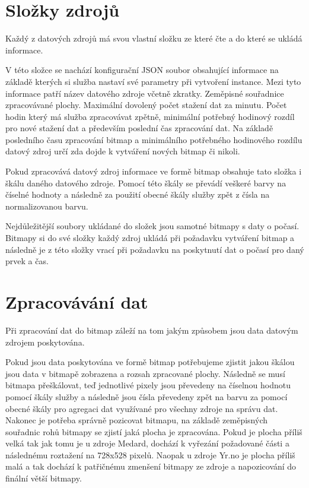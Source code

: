 \documentclass[czech,bachelor,dept460,male,csharp,cpdeclaration]{diploma}
\begin{document}
	\section{Složky zdrojů}
	
	Každý z datových zdrojů má svou vlastní složku ze které čte a do které se ukládá informace.
	
	V této složce se nachází konfigurační JSON soubor obsahující informace na základě kterých si služba nastaví své parametry při vytvoření instance. Mezi tyto informace patří název datového zdroje včetně zkratky. Zeměpisné souřadnice zpracovávané plochy. Maximální dovolený počet stažení dat za minutu. Počet hodin který má služba zpracovávat zpětně, minimální potřebný hodinový rozdíl pro nové stažení dat a především poslední čas zpracování dat. Na základě posledního času zpracování bitmap a minimálního potřebného hodinového rozdílu datový zdroj určí zda dojde k vytváření nových bitmap či nikoli.
	
	Pokud zpracovává datový zdroj informace ve formě bitmap obsahuje tato složka i škálu daného datového zdroje. Pomocí této škály se převádí veškeré barvy na číselné hodnoty a následně za použití obecné škály služby zpět z čísla na normalizovanou barvu.
	
	Nejdůležitější soubory ukládané do složek jsou samotné bitmapy s daty o počasí. Bitmapy si do své složky každý zdroj ukládá při požadavku vytváření bitmap a následně je z této složky vrací při požadavku na poskytnutí dat o počasí pro daný prvek a čas.
	
	\section{Zpracovávání dat}
	
	Při zpracování dat do bitmap záleží na tom jakým způsobem jsou data datovým zdrojem poskytována.
	
	Pokud jsou data poskytována ve formě bitmap potřebujeme zjistit jakou škálou jsou data v bitmapě zobrazena a rozsah zpracované plochy. Následně se musí bitmapa přeškálovat, teď jednotlivé pixely jsou převedeny na číselnou hodnotu pomocí škály služby a následně jsou čísla převedeny zpět na barvu za pomocí obecné škály pro agregaci dat využívané pro všechny zdroje na správu dat. Nakonec je potřeba správně pozicovat bitmapu, na základě zeměpisných souřadnic rohů bitmapy se zjistí jaká plocha je zpracována. Pokud je plocha příliš velká tak jak tomu je u zdroje Medard, dochází k vyřezání požadované části a následnému roztažení na 728x528 pixelů. Naopak u zdroje Yr.no je plocha příliš malá a tak dochází k patřičnému zmenšení bitmapy ze zdroje a napozicování do finální větší bitmapy.
	
\end{document}
